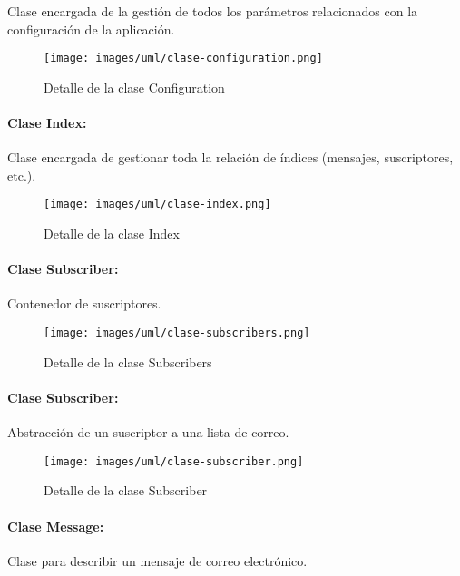 Clase encargada de la gestión de todos los parámetros relacionados con la
configuración de la aplicación.

\begin{figure}[H]
	\centering
 	\texttt{[image: images/uml/clase-configuration.png]}
	\caption{Detalle de la clase Configuration}
	\label{fig:uml:configuration-class}
\end{figure}

\paragraph{Clase Index:}

Clase encargada de gestionar toda la relación de índices (mensajes, suscriptores,
etc.).

\begin{figure}[H]
	\centering
 	\texttt{[image: images/uml/clase-index.png]}
	\caption{Detalle de la clase Index}
	\label{fig:uml:index-class}
\end{figure}

\paragraph{Clase Subscriber:}

Contenedor de suscriptores.

\begin{figure}[H]
	\centering
 	\texttt{[image: images/uml/clase-subscribers.png]}
	\caption{Detalle de la clase Subscribers}
	\label{fig:uml:subscribers-class}
\end{figure}

\paragraph{Clase Subscriber:}

Abstracción de un suscriptor a una lista de correo.

\begin{figure}[H]
	\centering
 	\texttt{[image: images/uml/clase-subscriber.png]}
	\caption{Detalle de la clase Subscriber}
	\label{fig:uml:subscriber-class}
\end{figure}

\paragraph{Clase Message:}

Clase para describir un mensaje de correo electrónico.

